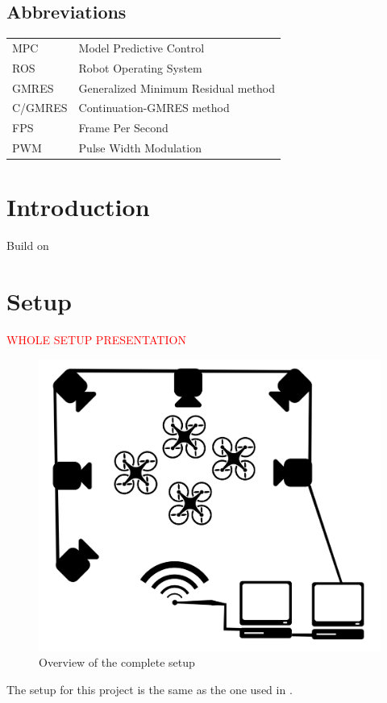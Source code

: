 \documentclass[a4paper, 12pt]{report}
\begin{document}
\subsection*{Abbreviations}
\begin{table}[h]
\centering
\begin{tabular}{p{8cm} p{8cm}}
MPC \dotfill & Model Predictive Control \\
ROS \dotfill & Robot Operating System \\
GMRES \dotfill & Generalized Minimum Residual method \\
C/GMRES \dotfill & Continuation-GMRES method \\
FPS \dotfill	 & Frame Per Second \\
PWM \dotfill	 & Pulse Width Modulation \\
\end{tabular} 
\end{table}

\newpage
{}
\listoftables

\newpage
{}
\listoffigures

\newpage
\setlength{\parskip}{1.5em}
\setlength{\parindent}{1em}
\setcounter{page}{1}

\section{Introduction}
Build on \cite{Suzuki2014}

\newpage
\section{Setup}
\textcolor{red}{WHOLE SETUP PRESENTATION}
\begin{figure}[htbp]
\centering
\includegraphics[width=.7\textwidth]{Images/setup}
\caption{Overview of the complete setup}
\label{fig:setup}
\end{figure}
The setup for this project is the same as the one used in \cite{Suzuki2014}. 
\end{document}
